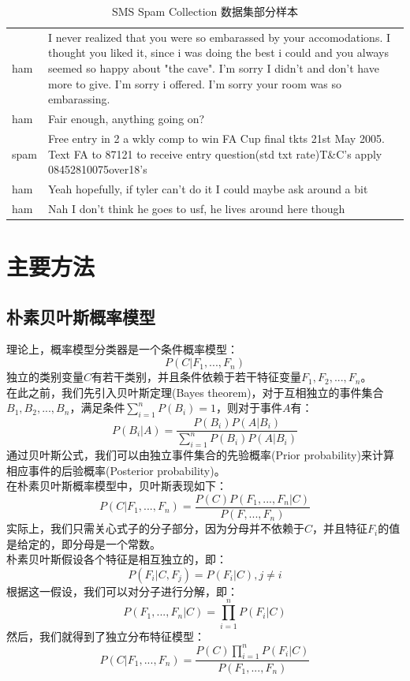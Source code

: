 \documentclass[a4paper, twocolumn, 12pt]{article}
\begin{document}
\begin{table}[hbtp]
    \centering
    \begin{tabular}{lp{14cm}}
        \hline
        ham&	I never realized that you were so embarassed by your accomodations. I thought you liked it, since i was doing the best i could and you always seemed so happy about "the cave". I'm sorry I didn't and don't have more to give. I'm sorry i offered. I'm sorry your room was so embarassing.\\
        ham&	Fair enough, anything going on?\\
        spam&	Free entry in 2 a wkly comp to win FA Cup final tkts 21st May 2005. Text FA to 87121 to receive entry question(std txt rate)T\&C's apply 08452810075over18's\\
        ham&	Yeah hopefully, if tyler can't do it I could maybe ask around a bit\\
        ham&	Nah I don't think he goes to usf, he lives around here though\\
        \hline
    \end{tabular}
    \caption{SMS Spam Collection 数据集部分样本}
    \label{table_1}
\end{table}

\section{主要方法}
\subsection{朴素贝叶斯概率模型}
理论上，概率模型分类器是一个条件概率模型：
\[ P(C|F_1, ..., F_n) \]
独立的类别变量$C$有若干类别，并且条件依赖于若干特征变量$F_1, F_2, ..., F_n$。\\

在此之前，我们先引入贝叶斯定理(Bayes theorem)，对于互相独立的事件集合${B_1, B_2, ..., B_n}$，满足条件$\sum_{i=1}^n P(B_i)=1$，则对于事件$A$有：
\[P(B_i|A)=\frac{P(B_i)P(A|B_i)}{\sum_{i=1}^n P(B_i)P(A|B_i)}\]
通过贝叶斯公式，我们可以由独立事件集合的先验概率(Prior probability)来计算相应事件的后验概率(Posterior probability)。\\

在朴素贝叶斯概率模型中，贝叶斯表现如下：
\[P(C|F_1, ..., F_n)=\frac{P(C)P(F_1, ..., F_n|C)}{P(F, ..., F_n)}\]
实际上，我们只需关心式子的分子部分，因为分母并不依赖于$C$，并且特征$F_i$的值是给定的，即分母是一个常数。\\

朴素贝叶斯假设各个特征是相互独立的，即：
\[P(F_i|C, F_j)=P(F_i|C), j \neq i\]
根据这一假设，我们可以对分子进行分解，即：
\[P(F_1, ..., F_n|C)=\prod_{i=1}^nP(F_i|C)\]
然后，我们就得到了独立分布特征模型：
\[P(C|F_1, ..., F_n)=\frac{P(C)\prod_{i=1}^n P(F_i|C)}{P(F_1, ..., F_n)}\]
\end{document}
